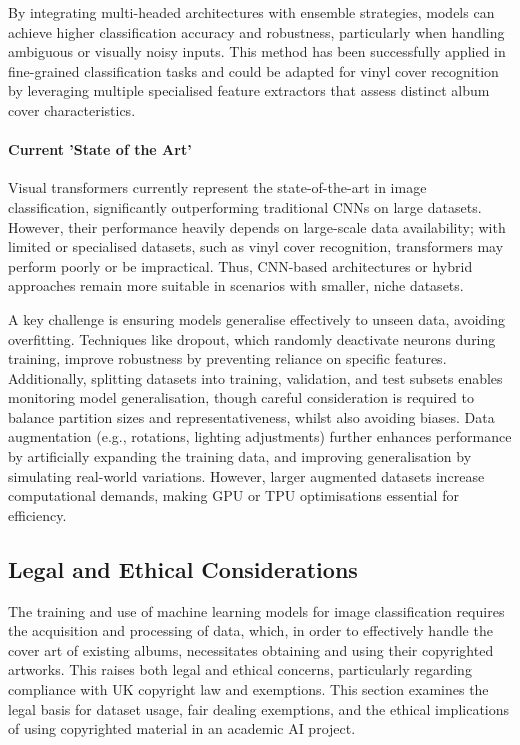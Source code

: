                 By integrating multi-headed architectures with ensemble strategies, models can achieve higher classification accuracy and robustness, particularly when handling ambiguous or visually noisy inputs. This method has been successfully applied in fine-grained classification tasks and could be adapted for vinyl cover recognition by leveraging multiple specialised feature extractors that assess distinct album cover characteristics.
    
            \paragraph{Current 'State of the Art'}
    
                Visual transformers currently represent the state-of-the-art in image classification, significantly outperforming traditional CNNs on large datasets. However, their performance heavily depends on large-scale data availability; with limited or specialised datasets, such as vinyl cover recognition, transformers may perform poorly or be impractical. Thus, CNN-based architectures or hybrid approaches remain more suitable in scenarios with smaller, niche datasets.
    
                A key challenge is ensuring models generalise effectively to unseen data, avoiding overfitting. Techniques like dropout, which randomly deactivate neurons during training, improve robustness by preventing reliance on specific features. Additionally, splitting datasets into training, validation, and test subsets enables monitoring model generalisation, though careful consideration is required to balance partition sizes and representativeness, whilst also avoiding biases. Data augmentation (e.g., rotations, lighting adjustments) further enhances performance by artificially expanding the training data, and improving generalisation by simulating real-world variations. However, larger augmented datasets increase computational demands, making GPU or TPU optimisations essential for efficiency.
    
        \subsection{Legal and Ethical Considerations}
    
          The training and use of machine learning models for image classification requires the acquisition and processing of data, which, in order to effectively handle the cover art of existing albums, necessitates obtaining and using their copyrighted artworks. This raises both legal and ethical concerns, particularly regarding compliance with UK copyright law and exemptions. This section examines the legal basis for dataset usage, fair dealing exemptions, and the ethical implications of using copyrighted material in an academic AI project.
    
